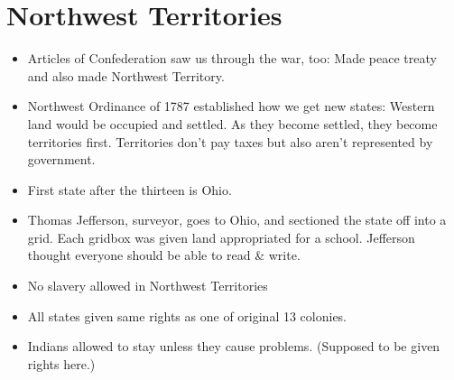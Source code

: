 \documentclass{article}
\begin{document}
  \section{Northwest Territories}
    \begin{itemize}
      \item Articles of Confederation saw us through the war, too: Made peace treaty and also made Northwest Territory. 
      \item Northwest Ordinance of 1787 established how we get new states: Western land would be occupied and settled. As they become settled, they become territories first. Territories don't pay taxes but also aren't represented by government.
      \item First state after the thirteen is Ohio.
      \item Thomas Jefferson, surveyor, goes to Ohio, and sectioned the state off into a grid. Each gridbox was given land appropriated for a school. Jefferson thought everyone should be able to read \& write.
      \item No slavery allowed in Northwest Territories
      \item All states given same rights as one of original 13 colonies.
      \item Indians allowed to stay unless they cause problems. (Supposed to be given rights here.)
    \end{itemize}
\end{document}
